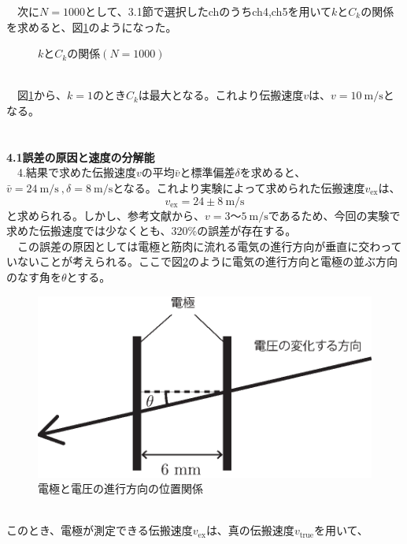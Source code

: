 \documentclass[a4paper,10.5pt]{ltjsarticle}
\begin{document}
\clearpage
　次に$N=1000$として、3.1節で選択したchのうちch4,ch5を用いて$k$と$C_k$の関係を求めると、図\ref{4-5N=1000}のようになった。
\begin{figure}[h]
  \centering
  
  \vspace{-35pt}\caption{$k$と$C_k$の関係$(N=1000)$}
  \label{4-5N=1000}
\end{figure}\\
　図\ref{4-5N=1000}から、$k=1$のとき$C_k$は最大となる。これより伝搬速度$v$は、$v=10\ \mathrm{m/s}$となる。\\
\\
\hspace{-2pt}{\Large \bfseries 5.考察}\\
{\large \bfseries 4.1誤差の原因と速度の分解能}\\
　4.結果で求めた伝搬速度$v$の平均$\bar{v}$と標準偏差$\delta$を求めると、$\bar{v}=24\ \mathrm{m/s}\ , \delta=8\ \mathrm{m/s}$となる。これより実験によって求められた伝搬速度$v_\mathrm{ex}$は、
\begin{equation}
  v_\mathrm{ex}=24\pm8\ \mathrm{m/s}
\end{equation}
と求められる。しかし、参考文献\cite{Murakami}から、$v=3〜5\ \mathrm{m/s}$であるため、今回の実験で求めた伝搬速度では少なくとも、320\%の誤差が存在する。\\
　この誤差の原因としては電極と筋肉に流れる電気の進行方向が垂直に交わっていないことが考えられる。ここで図\ref{electrode}のように電気の進行方向と電極の並ぶ方向のなす角を$\theta$とする。
\begin{figure}[h]
  \centering
  \includegraphics{figure2.eps}
  \vspace{-30pt}\caption{電極と電圧の進行方向の位置関係}
  \label{electrode}
\end{figure}\\
このとき、電極が測定できる伝搬速度$v_\mathrm{ex}$は、真の伝搬速度$v_\mathrm{true}$を用いて、
\end{document}
